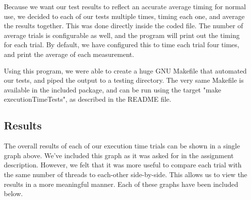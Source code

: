 \documentclass[journal]{IEEEtran}
\begin{document}
Because we want our test results to reflect an accurate average timing for normal use, we decided to each of our tests multiple times, timing each one, and average the results together. This was done directly inside the coded file. The number of average trials is configurable as well, and the program will print out the timing for each trial. By default, we have configured this to time each trial four times, and print the average of each measurement.

Using this program, we were able to create a huge GNU Makefile that automated our tests, and piped the output to a testing directory. The very same Makefile is available in the included package, and can be run using the target "make executionTimeTests", as described in the README file.

\subsection{Results}

The overall results of each of our execution time trials can be shown in a single graph above. We've included this graph as it was asked for in the assignment description. However, we felt that it was more useful to compare each trial with the same number of threads to each-other side-by-side. This allows us to view the results in a more meaningful manner. Each of these graphs have been included below.

\end{document}
